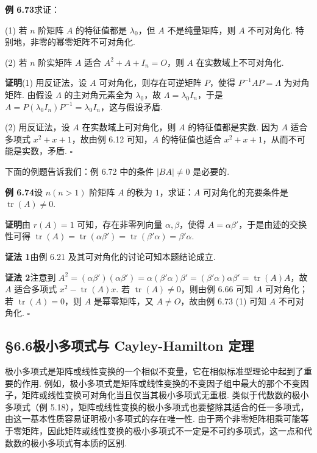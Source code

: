 \documentclass[UTF8,12pt,a4paper,fontset=fandol]{ctexart}
\begin{document}
\noindent\textbf{例 6.73}\quad 求证：

(1) 若 $n$ 阶矩阵 $A$ 的特征值都是 $\lambda_0$，但 $A$ 不是纯量矩阵，则 $A$ 不可对角化. 特别地，非零的幂零矩阵不可对角化.

(2) 若 $n$ 阶实矩阵 $A$ 适合 $A^2+A+I_n=O$，则 $A$ 在实数域上不可对角化.

\noindent\textbf{证明}\quad (1) 用反证法，设 $A$ 可对角化，则存在可逆矩阵 $P$，使得 $P^{-1}AP=\Lambda$ 为对角矩阵. 由假设 $\Lambda$ 的主对角元素全为 $\lambda_0$，故 $\Lambda=\lambda_0I_n$，于是 $A=P(\lambda_0I_n)P^{-1}=\lambda_0I_n$，这与假设矛盾.

(2) 用反证法，设 $A$ 在实数域上可对角化，则 $A$ 的特征值都是实数. 因为 $A$ 适合多项式 $x^2+x+1$，故由例 6.12 可知，$A$ 的特征值也适合 $x^2+x+1$，从而不可能是实数，矛盾. $\square$

下面的例题告诉我们：例 6.72 中的条件 $|BA|\ne 0$ 是必要的.

\noindent\textbf{例 6.74}\quad 设 $n(n>1)$ 阶矩阵 $A$ 的秩为 $1$，求证：$A$ 可对角化的充要条件是 $\operatorname{tr}(A)\ne 0$.

\noindent\textbf{证明}\quad 由 $r(A)=1$ 可知，存在非零列向量 $\alpha,\beta$，使得 $A=\alpha\beta'$，于是由迹的交换性可得 $\operatorname{tr}(A)=\operatorname{tr}(\alpha\beta')=\operatorname{tr}(\beta'\alpha)=\beta'\alpha$.

\noindent\textbf{证法 1}\quad 由例 6.21 及其可对角化的讨论可知本题结论成立.

\noindent\textbf{证法 2}\quad 注意到 $A^2=(\alpha\beta')(\alpha\beta')=\alpha(\beta'\alpha)\beta'=(\beta'\alpha)\alpha\beta'=\operatorname{tr}(A)A$，故 $A$ 适合多项式 $x^2-\operatorname{tr}(A)x$. 若 $\operatorname{tr}(A)\ne 0$，则由例 6.66 可知 $A$ 可对角化；若 $\operatorname{tr}(A)=0$，则 $A$ 是幂零矩阵，又 $A\ne O$，故由例 6.73 (1) 可知 $A$ 不可对角化. $\square$

\subsection*{§6.6\quad 极小多项式与 Cayley-Hamilton 定理}

极小多项式是矩阵或线性变换的一个相似不变量，它在相似标准型理论中起到了重要的作用. 例如，极小多项式是矩阵或线性变换的不变因子组中最大的那个不变因子，矩阵或线性变换可对角化当且仅当其极小多项式无重根. 类似于代数数的极小多项式（例 5.18），矩阵或线性变换的极小多项式也要整除其适合的任一多项式，由这一基本性质容易证明极小多项式的存在唯一性. 由于两个非零矩阵相乘可能等于零矩阵，因此矩阵或线性变换的极小多项式不一定是不可约多项式，这一点和代数数的极小多项式有本质的区别.
\end{document}
